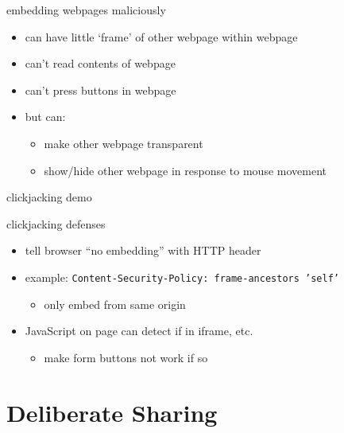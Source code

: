 
\begin{frame}{embedding webpages maliciously}
    \begin{itemize}
    \item can have little `frame' of other webpage within webpage
    \item can't read contents of webpage
    \item can't press buttons in webpage
    \vspace{.5cm}
    \item but can:
        \begin{itemize}
        \item make other webpage transparent
        \item show/hide other webpage in response to mouse movement
        \end{itemize}
    \end{itemize}
\end{frame}

\begin{frame}{clickjacking demo}
\end{frame}

\begin{frame}{clickjacking defenses}
    \begin{itemize}
    \item tell browser ``no embedding'' with HTTP header
    \item example: \texttt{\small Content-Security-Policy: frame-ancestors 'self'}
        \begin{itemize}
        \item only embed from same origin
        \end{itemize}
        \vspace{.5cm}
    \item JavaScript on page can detect if in iframe, etc.
        \begin{itemize}
        \item make form buttons not work if so
        \end{itemize}
    \end{itemize}
\end{frame}

\section{Deliberate Sharing}

